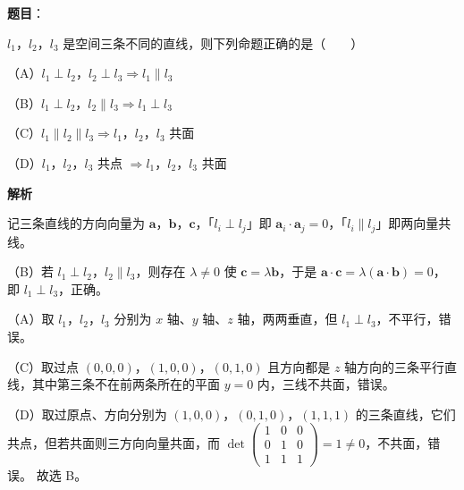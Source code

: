 \begin{answer}

\textbf{题目}：

$l_1$，$l_2$，$l_3$ 是空间三条不同的直线，则下列命题正确的是\mbox{（　　）}

（A）$l_1\perp l_2$，$l_2\perp l_3\Rightarrow l_1\parallel l_3$

（B）$l_1\perp l_2$，$l_2\parallel l_3\Rightarrow l_1\perp l_3$

（C）$l_1\parallel l_2\parallel l_3\Rightarrow l_1$，$l_2$，$l_3$ 共面

（D）$l_1$，$l_2$，$l_3$ 共点 $\Rightarrow l_1$，$l_2$，$l_3$ 共面

\textbf{解析}

记三条直线的方向向量为 $\boldsymbol a$，$\boldsymbol b$，$\boldsymbol c$，「$l_i\perp l_j$」即 $\boldsymbol a_i\cdot\boldsymbol a_j=0$，「$l_i\parallel l_j$」即两向量共线。

（B）若 $l_1\perp l_2$，$l_2\parallel l_3$，则存在 $\lambda\neq0$ 使 $\boldsymbol c=\lambda\boldsymbol b$，于是 $\boldsymbol a\cdot\boldsymbol c=\lambda(\boldsymbol a\cdot\boldsymbol b)=0$，即 $l_1\perp l_3$，正确。

（A）取 $l_1$，$l_2$，$l_3$ 分别为 $x$ 轴、$y$ 轴、$z$ 轴，两两垂直，但 $l_1\perp l_3$，不平行，错误。

（C）取过点 $(0,0,0)$，$(1,0,0)$，$(0,1,0)$ 且方向都是 $z$ 轴方向的三条平行直线，其中第三条不在前两条所在的平面 $y=0$ 内，三线不共面，错误。

（D）取过原点、方向分别为 $(1,0,0)$，$(0,1,0)$，$(1,1,1)$ 的三条直线，它们共点，但若共面则三方向向量共面，而 $\det\begin{pmatrix}1&0&0\\0&1&0\\1&1&1\end{pmatrix}=1\neq0$，不共面，错误。
故选 B。


\end{answer}
